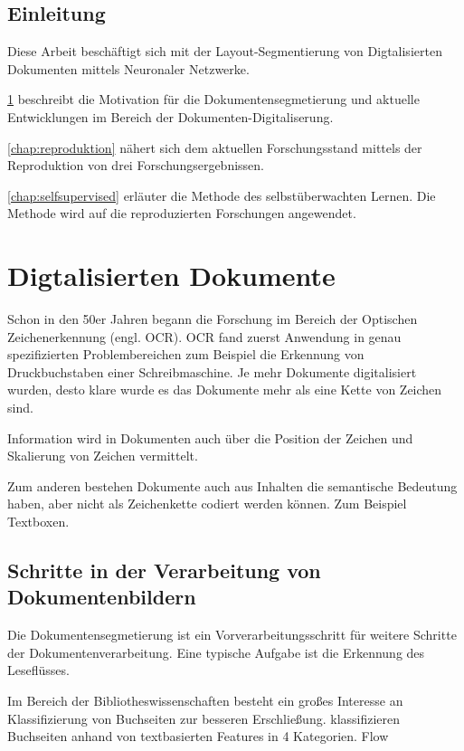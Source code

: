 \section*{Einleitung}
Diese Arbeit beschäftigt sich mit der Layout-Segmentierung von Digtalisierten Dokumenten mittels Neuronaler Netzwerke.

\cref{chap:documents} beschreibt die Motivation für die Dokumentensegmetierung und aktuelle Entwicklungen im
Bereich der Dokumenten-Digitaliserung.

\cref{chap:reproduktion} nähert sich dem aktuellen Forschungsstand mittels der Reproduktion von drei Forschungsergebnissen.

\cref{chap:selfsupervised} erläuter die Methode des selbstüberwachten Lernen. Die Methode wird auf die reproduzierten Forschungen angewendet.

\chapter{Digtalisierten Dokumente}
\label{chap:documents}


% 
Schon in den 50er Jahren begann die Forschung im Bereich der Optischen Zeichenerkennung 
(engl. OCR)\autocite{doermann_evolution_2014}. OCR fand zuerst Anwendung in genau 
spezifizierten Problembereichen zum Beispiel die Erkennung von Druckbuchstaben einer Schreibmaschine. 
Je mehr Dokumente digitalisiert wurden, desto klare wurde es das Dokumente mehr als 
eine Kette von Zeichen sind. 


Information wird in Dokumenten auch über die Position der Zeichen und Skalierung von Zeichen vermittelt.

Zum anderen bestehen Dokumente auch aus Inhalten die semantische Bedeutung haben, aber nicht als
Zeichenkette codiert werden können. 
Zum Beispiel Textboxen.

\section{Schritte in der Verarbeitung von Dokumentenbildern}
Die Dokumentensegmetierung ist ein Vorverarbeitungsschritt für weitere Schritte der Dokumentenverarbeitung.
Eine typische Aufgabe ist die Erkennung des Leseflüsses.

Im Bereich der Bibliotheswissenschaften besteht ein großes Interesse an Klassifizierung von
Buchseiten zur besseren Erschließung.
\cite{mcconnaughey_labeled_2017} klassifizieren Buchseiten anhand von textbasierten Features in 4 Kategorien. 
Flow

